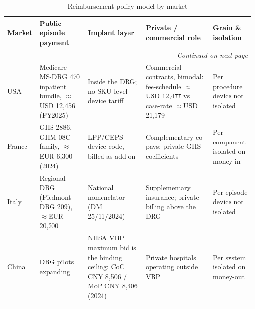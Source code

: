 \documentclass{article}
\begin{document}
\begin{longtable}{@{}p{1.4cm}>{\raggedright\arraybackslash}p{3.7cm}>{\raggedright\arraybackslash}p{3.0cm}>{\raggedright\arraybackslash}p{4.3cm}p{2.4cm}@{}}

\toprule
\textbf{Market} & \textbf{Public episode payment} & \textbf{Implant layer} & \textbf{Private / commercial role} & \textbf{Grain \& isolation} \\
\midrule
\endhead

\midrule
\multicolumn{5}{r}{\textit{Continued on next page}} \\
\endfoot

\endlastfoot

USA & Medicare MS-DRG 470 inpatient bundle, $\approx$USD 12{,}456 (FY2025)
& Inside the DRG; no SKU-level device tariff
& Commercial contracts, bimodal: fee-schedule $\approx$USD 12{,}477 vs case-rate $\approx$USD 21{,}179
& \parbox[t]{2.4cm}{\raggedright Per procedure\\[2pt] \footnotesize device not isolated} \\

France & GHS 2886, GHM 08C family, $\approx$EUR 6{,}300 (2024)
& LPP/CEPS device code, billed as add-on
& Complementary co-pays; private GHS coefficients
& \parbox[t]{2.4cm}{\raggedright Per component\\[2pt] \footnotesize isolated on money-in} \\

Italy & Regional DRG (Piedmont DRG 209), $\approx$EUR 20{,}200
& National nomenclator (DM 25/11/2024)
& Supplementary insurance; private billing above the DRG
& \parbox[t]{2.4cm}{\raggedright Per episode\\[2pt] \footnotesize device not isolated} \\

China & DRG pilots expanding
& NHSA VBP maximum bid is the binding ceiling: CoC CNY 8{,}506 / MoP CNY 8{,}306 (2024)
& Private hospitals operating outside VBP
& \parbox[t]{2.4cm}{\raggedright Per system\\[2pt] \footnotesize isolated on money-out} \\

\bottomrule

\caption{Reimbursement policy model by market}
\label{app:policy-model}

\end{longtable}

\normalsize
\vspace{0.25em}
\end{document}
